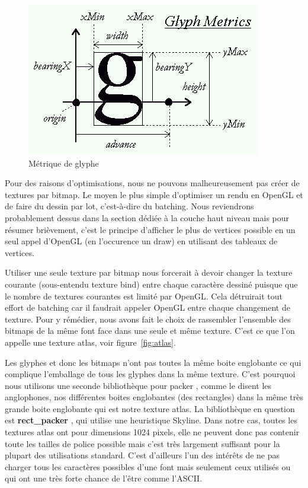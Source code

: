 \documentclass[12pt]{article}
\begin{document}
\begin{figure}[htp]
  \centering
  \includegraphics[scale=0.8]{images/metrics}
  \caption{Métrique de glyphe}
  \label{fig:metrics}
\end{figure}

Pour des raisons d'optimisations, nous ne pouvons malheureusement pas créer de textures par bitmap. Le moyen le plus simple d'optimiser un rendu en OpenGL et de faire du dessin par lot,
c'est-à-dire du batching. Nous reviendrons probablement dessus dans la section dédiée à la couche haut niveau mais pour résumer brièvement, c'est le principe d'afficher le plus
de vertices possible en un seul appel d'OpenGL (en l'occurence un draw) en utilisant des tableaux de vertices.

Utiliser une seule texture par bitmap nous forcerait à devoir changer la texture courante (sous-entendu texture bind) entre chaque caractère dessiné puisque que le nombre de textures
courantes est limité par OpenGL. Cela détruirait tout effort de batching car il faudrait appeler OpenGL entre chaque changement de texture.
Pour y rémédier, nous avons fait le choix de rassembler l'ensemble des bitmaps de la même font face dans une seule et même texture.
C'est ce que l'on appelle une texture atlas, voir figure~\ref{fig:atlas}.

Les glyphes et donc les bitmaps n'ont pas toutes la même boite englobante ce qui complique l'emballage de tous les glyphes dans la même texture.
C'est pourquoi nous utilisons une seconde bibliothèque pour \og packer \fg{}, comme le disent les anglophones, nos différentes boites englobantes (des rectangles) dans la même très grande boite
englobante qui est notre texture atlas. La bibliothèque en question est \textbf{rect\_packer} \cite{rect-packer}, qui utilise une heuristique Skyline. Dans notre cas, toutes les textures atlas
ont pour dimensions 1024 pixels, elle ne peuvent donc pas contenir toute les tailles de police possible mais c'est très largement suffisant pour la plupart des utilisations standard.
C'est d'ailleurs l'un des intérêts de ne pas charger tous les caractères possibles d'une font mais seulement ceux utilisés ou qui ont une très forte chance de l'être comme l'ASCII.
\end{document}

